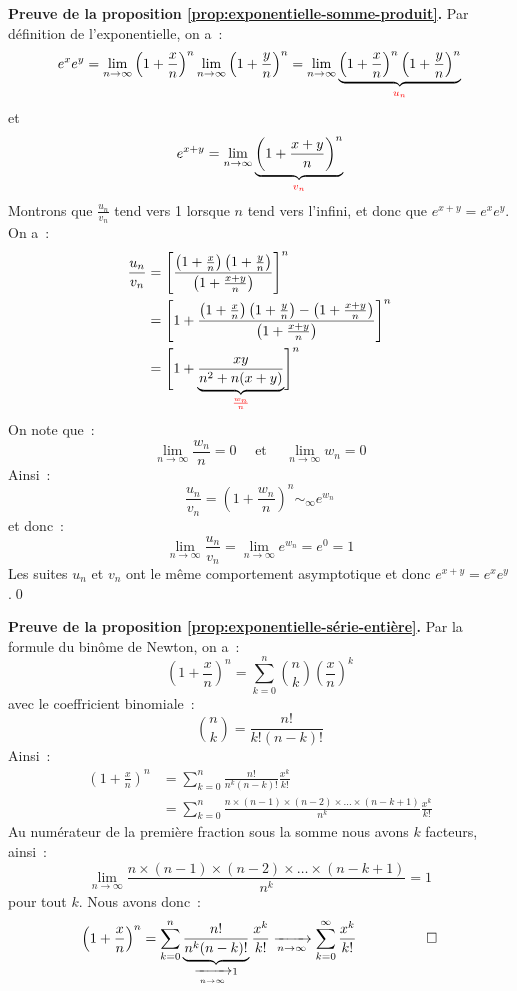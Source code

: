 \documentclass[10pt,notheorems]{beamer}
\theoremstyle{plain}
\theoremstyle{definition} %
\begin{document}
\begin{notes}

  \textbf{Preuve de la proposition \hyperlink{slide_derivee_exp_log_1}{\ref{prop:exponentielle-somme-produit}}.} Par définition de l'exponentielle, on a~:
  \[
    e^xe^y = \lim_{n\to\infty}\left( 1+\frac{x}{n} \right)^n\lim_{n\to\infty}\left( 1+\frac{y}{n}\right)^n =
    \lim_{n\to\infty}\underbrace{\left( 1+\frac{x}{n} \right)^n\left( 1+\frac{y}{n}\right)^n}_{\color{red}u_n}
  \]
  et
  \[
    e^{x+y} = \lim_{n\to\infty}\underbrace{\left( 1+\frac{x+y}{n} \right)^n }_{\color{red} v_n}
  \]
  Montrons que $\frac{u_n}{v_n}$ tend vers 1 lorsque $n$ tend vers l'infini, et donc que $e^{x+y}=e^xe^y$. On a~:
  \[
    \begin{split}
      \frac{u_n}{v_n} &= \left[ \frac{\left(1+\frac{x}{n}\right)\left(1+\frac{y}{n}\right)}{\left(1+\frac{x+y}{n}\right)}\right]^n\\
                      &= \left[ 1 + \frac{\left(1+\frac{x}{n}\right)\left(1+\frac{y}{n}\right)-\left(1+\frac{x+y}{n}\right)}{\left(1+\frac{x+y}{n}\right)}\right]^n\\
                      &= \Biggl[ 1 + \underbrace{\frac{xy}{n^2+n(x+y)}}_{\color{red}\frac{w_n}{n}} \Biggr]^n
    \end{split}
  \]
  On note que~:
  \[
    \lim_{n\to\infty}\frac{w_n}{n} = 0 \quad\text{ et }\quad \lim_{n\to\infty}w_n = 0
  \]
  Ainsi~:
  \[
    \frac{u_n}{v_n} = \left(1 + \frac{w_n}{n} \right)^n \sim_{\infty} e^{w_n}
  \]
  et donc~:
  \[
    \lim_{n\to\infty} \frac{u_n}{v_n} = \lim_{n\to\infty} e^{w_n} = e^0 = 1
  \]
  Les suites $u_n$ et $v_n$ ont le même comportement asymptotique et donc $e^{x+y}=e^xe^y$.\qed

  \medskip

  \textbf{Preuve de la proposition \hyperlink{slide_derivee_exp_log_1}{\ref{prop:exponentielle-série-entière}}.} Par la formule du binôme de Newton, on a~:
  \[
    \left( 1+ \frac{x}{n} \right)^n = \sum_{k=0}^n \binom{n}{k}\left(\frac{x}{n}\right)^k
  \]
  avec le coeffricient binomiale~:
  \[
    \binom{n}{k} = \frac{n!}{k!(n-k)!}
  \]
  Ainsi~:
  \[
    \begin{split}
      \left( 1+ \frac{x}{n} \right)^n &= \sum_{k=0}^n \frac{n!}{n^k(n-k)!}\frac{x^k}{k!}\\
      &= \sum_{k=0}^n \frac{n \times(n-1) \times (n-2) \times \dots \times (n-k+1)}{n^k}\frac{x^k}{k!}
    \end{split}
  \]
  Au numérateur de la première fraction sous la somme nous avons $k$ facteurs, ainsi~:
  \[
    \lim_{n\to\infty} \frac{n \times(n-1) \times (n-2) \times \dots \times (n-k+1)}{n^k} = 1
  \]
  pour tout $k$. Nous avons donc~:
  \[
    \left( 1+ \frac{x}{n} \right)^n = \sum_{k=0}^n \underbrace{\frac{n!}{n^k(n-k)!}}_{\xrightarrow[n\to\infty]{}1}\frac{x^k}{k!} \xrightarrow[n\to\infty]{}\sum_{k=0}^\infty \frac{x^k}{k!} \quad\quad\quad\qed
  \]


\end{notes}
\end{document}
